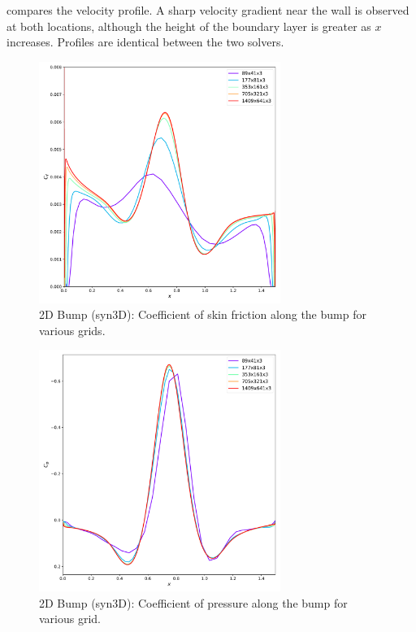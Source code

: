  compares the velocity profile. A sharp velocity gradient near the wall is observed at both locations, although the height of the boundary layer is greater as $x$ increases. Profiles are identical between the two solvers.
\begin{figure}[ht!]
\centering
  \includegraphics[width=0.7\textwidth]{figs/2dbump/CfGridStudy.pdf}
    \caption{2D Bump (syn3D): Coefficient of skin friction along the bump for various grids.}
    \label{fig:syn2dbumpcfstudy}
\end{figure}

\begin{figure}[ht!]
\centering
  \includegraphics[width=0.7\textwidth]{figs/2dbump/CpGridStudy.pdf}
    \caption{2D Bump (syn3D): Coefficient of pressure along the bump for various grid.}
    \label{fig:syn2dbumpcpstudy}
\end{figure}

